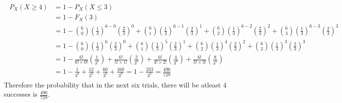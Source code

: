 \documentclass[journal,12pt,twocolumn]{IEEEtran}
\begin{document}
\begin{align}
\begin{split}
P_X(X \ge 4)&= 1-P_X(X \le 3)\\
&=1-F_X(3)\\
&=1-\binom{6}{0}\left(\frac{1}{3}\right)^{6-0}\left(\frac{2}{3}\right)^{0}+ \binom{6}{1}\left(\frac{1}{3}\right)^{6-1}\left(\frac{2}{3}\right)^{1}+ \binom{6}{2}\left(\frac{1}{3}\right)^{6-2}\left(\frac{2}{3}\right)^{2}+ \binom{6}{3}\left(\frac{1}{3}\right)^{6-3}\left(\frac{2}{3}\right)^{3}\\
&=1-\binom{6}{0}\left(\frac{1}{3}\right)^{6}\left(\frac{2}{3}\right)^{0}+ \binom{6}{1}\left(\frac{1}{3}\right)^{5}\left(\frac{2}{3}\right)^{1}+ \binom{6}{2}\left(\frac{1}{3}\right)^{4}\left(\frac{2}{3}\right)^{2}+ \binom{6}{3}\left(\frac{1}{3}\right)^{3}\left(\frac{2}{3}\right)^{3}\\
&=1-\frac{6!}{6!\times 0!}\left(\frac{1}{3^{6}}\right)+ \frac{6!}{5!\times 1!}\left(\frac{2}{3^{6}}\right)+ \frac{6!}{4!\times 2!}\left(\frac{4}{3^{6}}\right)+ \frac{6!}{3!\times 3!}\left(\frac{8}{3^{6}}\right)\\
&=1- \frac{1}{3^{6}}+ \frac{12}{3^{6}}+ \frac{60}{3^{6}}+ \frac{160}{3^{6}}= 1-\frac{233}{3^{6}}= \frac{496}{729}
\end{split}
\end{align}
Therefore the probability that in the next six trials, there will be atleast 4 successes is $\frac{496}{729}$.
\end{document}
